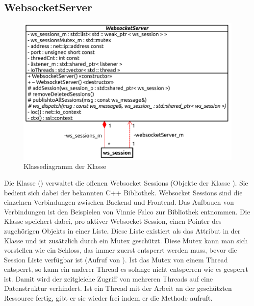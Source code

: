 \subsection{WebsocketServer}
\begin{figure}[ht]
  \centering
  \includegraphics[width=\textwidth]{content/hauptteil/umsetzungPoC/backend/uml/classesOfOverview/WebsocketServer.pdf}
  \caption{Klassediagramm der Klasse }
  \label{fig:backend:classDiag:WebsocketServer}
\end{figure}
Die Klasse  () verwaltet die offenen Websocket Sessions (Objekte der Klasse ).
Sie bedient sich dabei der bekannten  C++ Bibliothek.
Websocket Sessions sind die einzelnen Verbindungen zwischen Backend und Frontend.
Das Aufbauen von Verbindungen ist den Beispielen von Vinnie Falco zur  Bibliothek entnommen.
Die  Klasse speichert dabei, pro aktiver Websocket Session, einen Pointer des zugehörigen  Objekts in einer Liste.
Diese Liste existiert als das Attribut  in der Klasse  und ist zusätzlich durch ein Mutex geschützt.
Diese Mutex kann man sich vorstellen wie ein Schloss, das immer zuerst entsperrt werden muss, 
bevor die Session Liste verfügbar ist (Aufruf von ). 
Ist das Mutex von einem Thread entsperrt, so kann ein anderer Thread es solange nicht entsperren wie es gesperrt ist.
Damit wird der zeitgleiche Zugriff von mehreren Threads auf eine Datenstruktur verhindert.
Ist ein Thread mit der Arbeit an der geschützten Ressource fertig, gibt er sie wieder frei indem er die Methode  aufruft.
